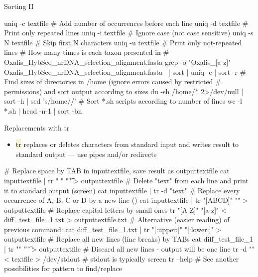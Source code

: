 \documentclass[compress, xelatex, 11pt, xcolor=svgnames, aspectratio=169, url={hyphens, lowtilde}]{beamer}
\renewcommand{\texttt}[1]{\colorbox{Beige}{{\ttfamily #1}}}
\begin{document}
\begin{frame}[fragile]{Sorting II}
	\begin{bashcode}
    uniq -c textfile # Add number of occurrences before each line
    uniq -d textfile # Print only repeated lines
    uniq -i textfile # Ignore case (not case sensitive)
    uniq -s N textfile # Skip first N characters
    uniq -u textfile # Print only not-repeated lines
    # How many times is each taxon presented in
    #  Oxalis_HybSeq_nrDNA_selection_alignment.fasta
    grep -o "Oxalis_[a-z]\+" Oxalis_HybSeq_nrDNA_selection_alignment.fasta \
      | sort | uniq -c | sort -r
    # Find sizes of directories in /home (ignore errors caused by restricted
    # permissions) and sort output according to sizes
    du -sh /home/* 2>/dev/null | sort -h | sed 's/\/home\///'
    # Sort *.sh scripts according to number of lines
    wc -l *.sh | head -n-1 | sort -bn
	\end{bashcode}
\end{frame}

\begin{frame}[fragile]{Replacements with tr}
	\begin{itemize}
		\item \texttt{tr} replaces or deletes characters from standard input and writes result to standard output --- use pipes and/or redirects
	\end{itemize}
	\vfill
	\begin{bashcode}
    # Replace space by TAB in inputtextfile, save result as outputtextfile
    cat inputtextfile | tr " " "\t" > outputtextfile
    # Delete "text" from each line and print it to standard output (screen)
    cat inputtextfile | tr -d "text"
    # Replace every occurrence of A, B, C or D by a new line (\n)
    cat inputtextfile | tr "[ABCD]" "\n" > outputtextfile
    # Replace capital letters by small ones
    tr "[A-Z]" "[a-z]" < diff_test_file_1.txt > outputtextfile.txt
    # Alternative (easier reading) of previous command:
    cat diff_test_file_1.txt | tr "[:upper:]" "[:lower:]" > outputtextfile
    # Replace all new lines (line breaks) by TABs
    cat diff_test_file_1 | tr "\n" "\t"  > outputtextfile
    # Discard all new lines - output will be one line
    tr -d "\n" < textfile > /dev/stdout # stdout is typically screen
    tr --help # See another possibilities for pattern to find/replace
	\end{bashcode}
\end{frame}
\end{document}
